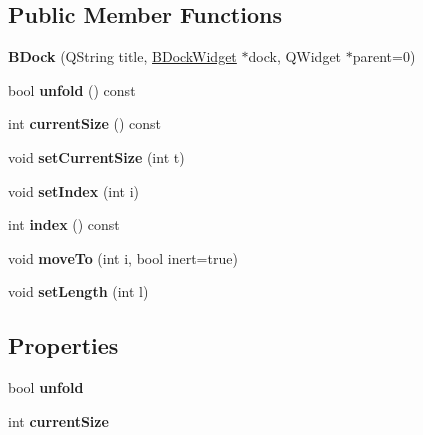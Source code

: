\subsection*{\-Public \-Member \-Functions}
\begin{DoxyCompactItemize}
\item 
\hypertarget{class_b_dock_a195c91aa591793e1db3bf2d721331b4c}{{\bfseries \-B\-Dock} (\-Q\-String title, \hyperlink{class_b_dock_widget}{\-B\-Dock\-Widget} $\ast$dock, \-Q\-Widget $\ast$parent=0)}\label{class_b_dock_a195c91aa591793e1db3bf2d721331b4c}

\item 
\hypertarget{class_b_dock_a21b9723265fcb7dc4f3e226128e9c2d0}{bool {\bfseries unfold} () const }\label{class_b_dock_a21b9723265fcb7dc4f3e226128e9c2d0}

\item 
\hypertarget{class_b_dock_af8bcd829e5f2ab8fba2368540768ebee}{int {\bfseries current\-Size} () const }\label{class_b_dock_af8bcd829e5f2ab8fba2368540768ebee}

\item 
\hypertarget{class_b_dock_a4c684a21bdc74caac19f5f0e70edc728}{void {\bfseries set\-Current\-Size} (int t)}\label{class_b_dock_a4c684a21bdc74caac19f5f0e70edc728}

\item 
\hypertarget{class_b_dock_a3f417a557fece1a4edea4e48528c76e1}{void {\bfseries set\-Index} (int i)}\label{class_b_dock_a3f417a557fece1a4edea4e48528c76e1}

\item 
\hypertarget{class_b_dock_a9a0b7a754ee74062bd257277ab59edb4}{int {\bfseries index} () const }\label{class_b_dock_a9a0b7a754ee74062bd257277ab59edb4}

\item 
\hypertarget{class_b_dock_a1e7934b069656acb48fb19ac91e1cfac}{void {\bfseries move\-To} (int i, bool inert=true)}\label{class_b_dock_a1e7934b069656acb48fb19ac91e1cfac}

\item 
\hypertarget{class_b_dock_ad87572e3aa0252ff1e88dc526d753ce5}{void {\bfseries set\-Length} (int l)}\label{class_b_dock_ad87572e3aa0252ff1e88dc526d753ce5}

\end{DoxyCompactItemize}
\subsection*{\-Properties}
\begin{DoxyCompactItemize}
\item 
\hypertarget{class_b_dock_ad753b995b42a49438012098075c19fec}{bool {\bfseries unfold}}\label{class_b_dock_ad753b995b42a49438012098075c19fec}

\item 
\hypertarget{class_b_dock_a2f08c7610017d5c6cb81421666409c9b}{int {\bfseries current\-Size}}\label{class_b_dock_a2f08c7610017d5c6cb81421666409c9b}

\end{DoxyCompactItemize}


